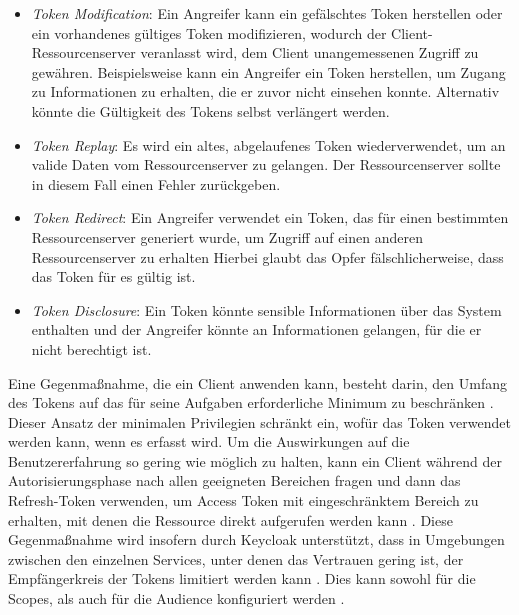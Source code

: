 \begin{itemize}
	\item \textit{Token Modification}: Ein Angreifer kann ein gefälschtes Token herstellen oder ein vorhandenes gültiges Token modifizieren, wodurch der Client-Ressourcenserver veranlasst wird, dem Client unangemessenen Zugriff zu gewähren. Beispielsweise kann ein Angreifer ein Token herstellen, um Zugang zu Informationen zu erhalten, die er zuvor nicht einsehen konnte. Alternativ könnte die Gültigkeit des Tokens selbst verlängert werden. \cite{SSEB_RFC6750}
	
	\item \textit{Token Replay}: Es wird ein altes, abgelaufenes Token wiederverwendet, um an valide Daten vom Ressourcenserver zu gelangen. Der Ressourcenserver sollte in diesem Fall einen Fehler zurückgeben. \cite{SSEB_RFC6750}
	
	\item \textit{Token Redirect}: Ein Angreifer verwendet ein Token, das für einen bestimmten Ressourcenserver generiert wurde, um Zugriff auf einen anderen Ressourcenserver zu erhalten Hierbei glaubt das Opfer fälschlicherweise, dass das Token für es gültig ist. \cite{SSEB_RFC6750}
	
	\item \textit{Token Disclosure}: Ein Token könnte sensible Informationen über das System enthalten und der Angreifer könnte an Informationen gelangen, für die er nicht berechtigt ist. \cite{SSEB_RFC6750}
\end{itemize}

Eine Gegenmaßnahme, die ein Client anwenden kann, besteht darin, den Umfang des Tokens auf das für seine Aufgaben erforderliche Minimum zu beschränken \cite{SSEB_OAuthAuthorizationSecurityConsiderations}. Dieser Ansatz der minimalen Privilegien schränkt ein, wofür das Token verwendet werden kann, wenn es erfasst wird. Um die Auswirkungen auf die Benutzererfahrung so gering wie möglich zu halten, kann ein Client während der Autorisierungsphase nach allen geeigneten Bereichen fragen und dann das Refresh-Token verwenden, um Access Token mit eingeschränktem Bereich zu erhalten, mit denen die Ressource direkt aufgerufen werden kann \cite{SSEB_OAuthAuthorizationSecurityConsiderations}. Diese Gegenmaßnahme wird insofern durch Keycloak unterstützt, dass in Umgebungen zwischen den einzelnen Services, unter denen das Vertrauen gering ist, der Empfängerkreis der Tokens limitiert werden kann \cite[Sec. 19]{SSEB_keycloakDocs}. Dies kann sowohl für die Scopes, als auch für die Audience konfiguriert werden \cite[Sec. 19]{SSEB_keycloakDocs}.

